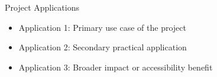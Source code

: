 
\begin{frame}{Project Applications}
    \begin{itemize}
        \item Application 1: Primary use case of the project
        \item Application 2: Secondary practical application
        \item Application 3: Broader impact or accessibility benefit
    \end{itemize}
\end{frame}
